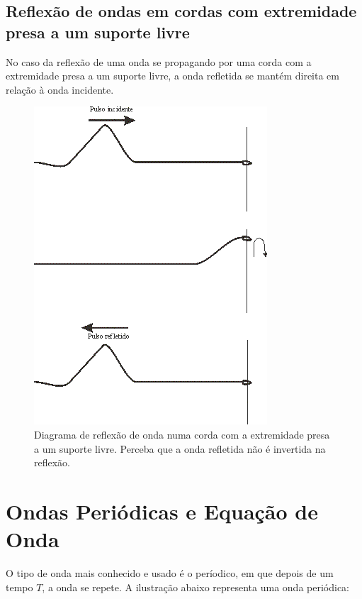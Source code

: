 \documentclass[12pt]{extarticle}
\newcommand{\<}{\langle}
\renewcommand{\>}{\rangle}
\theoremstyle{definition}
\begin{document}
\subsection{Reflexão de ondas em cordas com extremidade presa a um suporte livre}

No caso da reflexão de uma onda se propagando por uma corda com a extremidade presa a um suporte livre, a onda refletida se mantém direita em relação à onda incidente.

\begin{figure}[H]
    \centering
    \includegraphics[width=.6\textwidth]{refl2.png}
    \caption{Diagrama de reflexão de onda numa corda com a extremidade presa a um suporte livre. Perceba que a onda refletida não é invertida na reflexão.}
    \label{fig:reflexao_livre}
\end{figure}

\section{Ondas Periódicas e Equação de Onda}
O tipo de onda mais conhecido e usado é o períodico, em que depois de um tempo $T$, a onda se repete.
A ilustração abaixo representa uma onda periódica:
\end{document}
